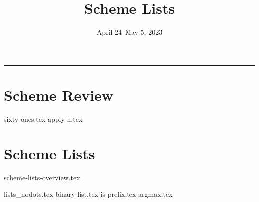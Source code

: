 \documentclass{exam}
\title{Scheme Lists}
\date{April 24--May 5, 2023}
\begin{document}
\maketitle\rule{\textwidth}{0.15em}

\section{Scheme Review}
\begin{questions}
    {sixty-ones.tex}
    {apply-n.tex}
\end{questions}

\section{Scheme Lists}
{scheme-lists-overview.tex}
\newpage
\begin{questions}
{lists_nodots.tex}
{binary-list.tex}
{is-prefix.tex}
{argmax.tex} 
\end{questions}
\end{document}
